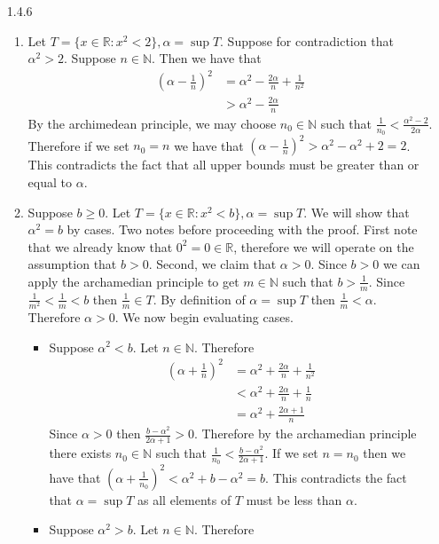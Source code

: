 \documentclass[12pt, letterpaper]{article}
\newcommand{\N}{\mathbb{N}}
\newcommand{\R}{\mathbb{R}}
\begin{document}
\begin{enumerate}
\begin{enumerate}
	\end{enumerate}
	\item[1.4.6]	
	\begin{enumerate}
		\item Let $T = \{x \in \R: x^2 < 2\}, \alpha = \sup T$.  Suppose for contradiction that $\alpha^2 > 2$.  Suppose $n \in \N$. Then we have that
		\begin{align*}
		\left(\alpha - \frac{1}{n}\right)^2 &= \alpha^2 -\frac{2\alpha}{n} + \frac{1}{n^2}\\
			&> \alpha^2 -\frac{2\alpha}{n}
		\end{align*}
		By the archimedean principle, we may choose $n_0 \in \N$ such that $\frac{1}{n_0} < \frac{\alpha^2 - 2}{2 \alpha}$.  Therefore if we set $n_0 = n$ we have that $\left(\alpha - \frac{1}{n}\right)^2 > \alpha^2 - \alpha^2 + 2 = 2$.  This contradicts the fact that all upper bounds must be greater than or equal to $\alpha$.
		\item Suppose $b \geq 0$.  Let $T = \{x \in \R: x^2 < b\}, \alpha = \sup T$.  We will show that $\alpha^2 = b$ by cases.  Two notes before proceeding with the proof.  First note that we already know that $0^2 = 0 \in \R$, therefore we will operate on the assumption that $b > 0$.  Second, we claim that $\alpha > 0$.  Since $b > 0$ we can apply the archamedian principle to get $m \in \N$ such that $b > \frac{1}{m}$.  Since $\frac{1}{m^2} < \frac{1}{m} < b$ then $\frac{1}{m} \in T$.  By definition of $\alpha = \sup T$ then $\frac{1}{m} < \alpha$.  Therefore $\alpha > 0$.  We now begin evaluating cases. 
		\begin{itemize}
			\item Suppose $\alpha^2 < b$.  Let $n \in \N$.  Therefore 
			\begin{align*}
				\left( \alpha + \frac{1}{n}\right)^2 &= \alpha^2 + \frac{2\alpha}{n} + \frac{1}{n^2}\\
				&< \alpha^2 + \frac{2\alpha}{n} + \frac{1}{n}\\
				&= \alpha^2 + \frac{2\alpha + 1}{n}
			\end{align*}
			Since $\alpha > 0$ then $\frac{b - \alpha^2}{2\alpha + 1} > 0$.  Therefore by the archamedian principle there exists $n_0 \in \N$ such
			that $\frac{1}{n_0} < \frac{b - \alpha^2}{2\alpha + 1}$.  If we set $n = n_0$ then we have that $(\alpha + \frac{1}{n_0})^2 <\alpha^2 + b - \alpha^2 = b$.  This contradicts the fact that $\alpha = \sup T$ as all elements of $T$ must be less than $\alpha$.
			\item Suppose $\alpha^2 > b$.  Let $n \in \N$.  Therefore 

\end{itemize}
\end{enumerate}
\end{enumerate}
\end{document}
